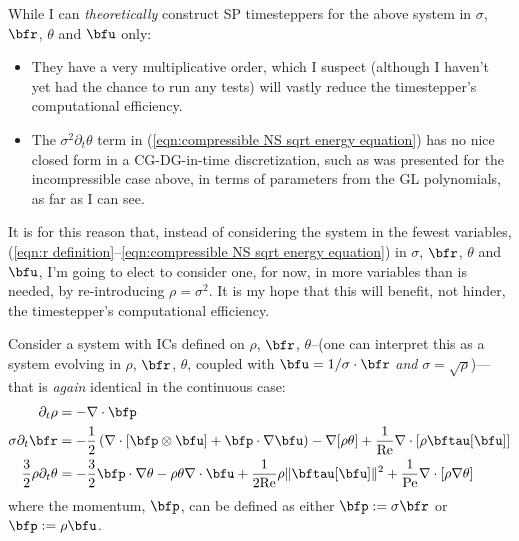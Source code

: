     \begin{remark}
        While I can \emph{theoretically} construct SP timesteppers for the above system in $\sigma$, $\bfr$, $\theta$ and $\bfu$ only:
        \begin{itemize}
            \item  They have a very multiplicative order, which I suspect (although I haven't yet had the chance to run any tests) will vastly reduce the timestepper's computational efficiency.
            \item  The $\sigma^{2}\partial_{t}\theta$ term in (\ref{eqn:compressible NS sqrt energy equation}) has no nice closed form in a CG-DG-in-time discretization, such as was presented for the incompressible case above, in terms of parameters from the GL polynomials, as far as I can see.
        \end{itemize}
        It is for this reason that, instead of considering the system in the fewest variables, (\ref{eqn:r definition}--\ref{eqn:compressible NS sqrt energy equation}) in $\sigma$, $\bfr$, $\theta$ and $\bfu$, I'm going to elect to consider one, for now, in more variables than is needed, by re-introducing $\rho = \sigma^{2}$. It is my hope that this will benefit, not hinder, the timestepper's computational efficiency.
    \end{remark}

    Consider a system with ICs defined on $\rho$, $\bfr$, $\theta$--(one can interpret this as a system evolving in $\rho$, $\bfr$, $\theta$, coupled with $\bfu = 1/\sigma\cdot\bfr$ \emph{and} $\sigma = \sqrt{\rho}$)---that is \emph{again} identical in the continuous case:
    \begin{align}
                         \partial_{t}\rho  &=  - \nabla\cdot\bfp  \label{eqn:compressible NS final mass equation}  \\
                   \sigma\partial_{t}\bfr  &=  - \frac{1}{2}\left(\nabla\cdot\left[\bfp\otimes\bfu\right] + \bfp\cdot\nabla\bfu\right) - \nabla[\rho\theta] + \frac{1}{\rmRe}\nabla\cdot\left[\rho\bftau[\bfu]\right]  \\
        \frac{3}{2}\rho\partial_{t}\theta  &=  - \frac{3}{2}\bfp\cdot\nabla\theta - \rho\theta\nabla\cdot\bfu + \frac{1}{2\rmRe}\rho\|\bftau[\bfu]\|^{2} + \frac{1}{\rmPe}\nabla\cdot\left[\rho\nabla\theta\right]  \label{eqn:compressible NS final energy equation}
    \end{align}
    where the momentum, $\bfp$, can be defined as either $\bfp := \sigma\bfr$ or $\bfp := \rho\bfu$.

